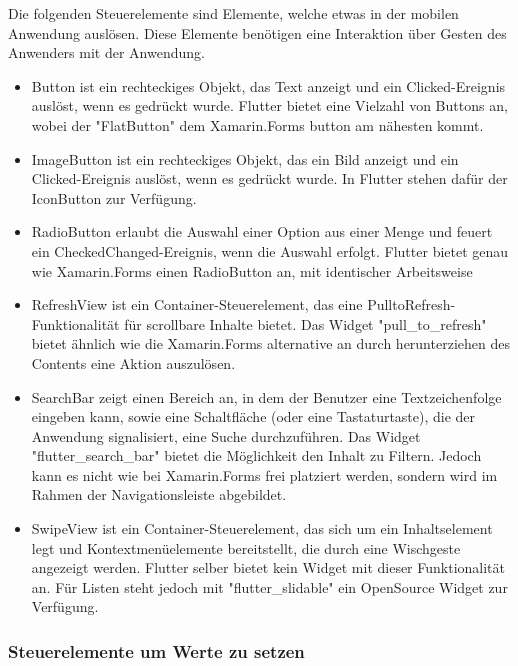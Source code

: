 Die folgenden Steuerelemente sind Elemente,  welche etwas in der mobilen Anwendung auslösen.  Diese Elemente benötigen eine Interaktion über Gesten des Anwenders mit der Anwendung. 
\begin{itemize}
\setlength\itemsep{-0.6em}
 \item Button ist ein rechteckiges Objekt, das Text anzeigt und ein Clicked-Ereignis auslöst, wenn es gedrückt wurde.  Flutter bietet eine Vielzahl von Buttons an, wobei der "FlatButton" dem Xamarin.Forms button am nähesten kommt.
 \item ImageButton ist ein rechteckiges Objekt, das ein Bild anzeigt und ein Clicked-Ereignis auslöst, wenn es gedrückt wurde.  In Flutter stehen dafür der IconButton zur Verfügung.
  \item RadioButton erlaubt die Auswahl einer Option aus einer Menge und feuert ein CheckedChanged-Ereignis, wenn die Auswahl erfolgt. Flutter bietet genau wie Xamarin.Forms einen RadioButton an,  mit identischer Arbeitsweise
 \item RefreshView ist ein Container-Steuerelement, das eine Pull\-to\-Refresh-Funktionalität für scrollbare Inhalte bietet.  Das Widget "pull\_to\_refresh" bietet ähnlich wie die Xamarin.Forms alternative an durch herunterziehen des Contents eine Aktion auszulösen.
 \item SearchBar zeigt einen Bereich an, in dem der Benutzer eine Textzeichenfolge eingeben kann, sowie eine Schaltfläche (oder eine Tastaturtaste), die der Anwendung signalisiert, eine Suche durchzuführen. Das Widget "flutter\_search\_bar" bietet die Möglichkeit den Inhalt zu Filtern.  Jedoch kann es nicht wie bei Xamarin.Forms frei platziert werden, sondern wird im Rahmen der Navigationsleiste abgebildet. 
 \item SwipeView ist ein Container-Steuerelement, das sich um ein Inhaltselement legt und Kontextmenüelemente bereitstellt, die durch eine Wischgeste angezeigt werden.  Flutter selber bietet kein Widget mit dieser Funktionalität an.  Für Listen steht jedoch mit "flutter\_slidable" ein OpenSource Widget zur Verfügung. 
\end{itemize}



\subsubsection{Steuerelemente um Werte zu setzen}

